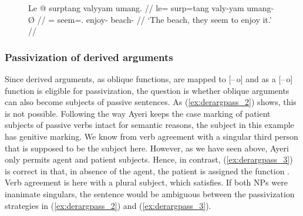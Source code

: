 \begin{figure}[h]
\ex\label{ex:raisept}\begingl
	\gla Le @ surptang valyyam umang. //
	\glb le= surp=tang valy-yam umang-Ø //
	\glc \PatTI{}= seem=\TplM.\Aarg{} enjoy-\Ptcp{} beach-\Top{} //
	\glft `The beach, they seem to enjoy it.' //
\endgl\xe
\end{figure}


\subsubsection{Passivization of derived arguments}

Since derived arguments, as oblique functions, are mapped to \mbox{[–\,o]} and
\Subj{} as a [\mbox{–\,o}] function is eligible for passivization, the question is
whether oblique arguments can also become subjects of passive sentences. As
(\ref{ex:derargpass_2}) shows, this is not possible. Following the way Ayeri
keeps the case marking of patient subjects of passive verbs intact for semantic
reasons, the subject in this example has genitive marking. We know from verb
agreement with a singular third person that  is
supposed to be the subject here. However, as we have seen above, Ayeri only
permits agent and patient subjects. Hence, in contrast, (\ref{ex:derargpass_3})
is correct in that, in absence of the agent, the patient is assigned the \Subj{}
function \citep[334]{bresnan2016}. Verb agreement is here with a plural
subject, which  satisfies. If both NPs were
inanimate singulars, the sentence would be ambiguous between the passivization
strategies in (\ref{ex:derargpass_2}) and (\ref{ex:derargpass_3}).

